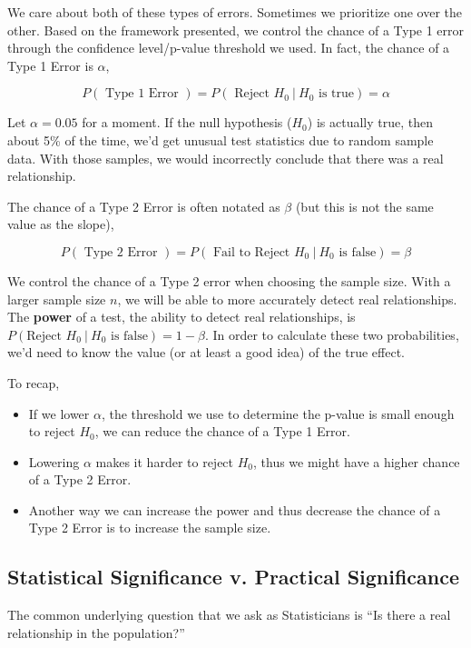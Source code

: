 \documentclass[
]{book}
\providecommand{\tightlist}{%
  \setlength{\itemsep}{0pt}\setlength{\parskip}{0pt}}
\begin{document}
We care about both of these types of errors. Sometimes we prioritize one over the other. Based on the framework presented, we control the chance of a Type 1 error through the confidence level/p-value threshold we used. In fact, the chance of a Type 1 Error is \(\alpha\),

\[P(\text{ Type 1 Error }) = P(\text{ Reject }H_0 ~|~H_0\text{ is true} ) =  \alpha\]

Let \(\alpha = 0.05\) for a moment. If the null hypothesis (\(H_0\)) is actually true, then about 5\% of the time, we'd get unusual test statistics due to random sample data. With those samples, we would incorrectly conclude that there was a real relationship.

The chance of a Type 2 Error is often notated as \(\beta\) (but this is not the same value as the slope),

\[P(\text{ Type 2 Error }) = P(\text{ Fail to Reject }H_0 ~|~H_0\text{ is false} ) =  \beta\]

We control the chance of a Type 2 error when choosing the sample size. With a larger sample size \(n\), we will be able to more accurately detect real relationships. The \textbf{power} of a test, the ability to detect real relationships, is \(P(\text{Reject }H_0 ~|~H_0\text{ is false}) = 1 - \beta\). In order to calculate these two probabilities, we'd need to know the value (or at least a good idea) of the true effect.

To recap,

\begin{itemize}
\tightlist
\item
  If we lower \(\alpha\), the threshold we use to determine the p-value is small enough to reject \(H_0\), we can reduce the chance of a Type 1 Error.
\item
  Lowering \(\alpha\) makes it harder to reject \(H_0\), thus we might have a higher chance of a Type 2 Error.
\item
  Another way we can increase the power and thus decrease the chance of a Type 2 Error is to increase the sample size.
\end{itemize}

\subsection{Statistical Significance v. Practical Significance}\label{statistical-significance-v.-practical-significance}

The common underlying question that we ask as Statisticians is ``Is there a real relationship in the population?''
\end{document}
